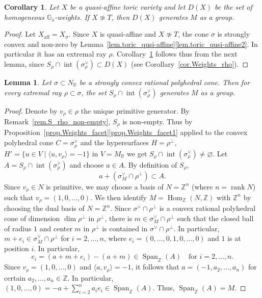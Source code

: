 \documentclass[11pt]{article}
\numberwithin{equation}{section}
\newcommand{\ra}{\mathrm{a}}
\let\oldvee\vee
\renewcommand{\vee}{{\scriptscriptstyle\oldvee}}
\let\oldbot\bot
\renewcommand{\bot}{{\scriptscriptstyle\oldbot}}
\theoremstyle{plain}
\newtheorem{lemma}[theorem]{Lemma}
\newtheorem{corollary}[theorem]{Corollary}
\theoremstyle{definition}
\DeclareMathOperator{\Hom}{Hom}
\DeclareMathOperator{\rank}{rank}
\DeclareMathOperator{\aff}{aff}
\DeclareMathOperator{\Span}{Span}
\DeclareMathOperator{\inter}{int}
\newcommand{\GG}{\mathbb{G}}
\newcommand{\RR}{\mathbb{R}}
\newcommand{\ZZ}{\mathbb{Z}}
\newcommand{\set}[2]{\{#1 \mid #2\}}
\newcommand{\sprod}[2]{\langle #1, #2 \rangle}
\begin{document}
\begin{corollary}
\label{cor.DX_generates_M_as_a_group}
Let $X$ be a quasi-affine toric variety and let $D(X)$ be the set of
homogeneous $\GG_\ra$-weights. If
$X \not \simeq T$, then $D(X)$ generates $M$ as a group.
\end{corollary}

\begin{proof}
Let $X_{\aff} = X_{\sigma}$.
Since $X$ is quasi-affine and $X \not\simeq T$, the cone $\sigma$ is strongly convex and
non-zero by Lemma~\ref{lem.toric_qusi-affine}\eqref{lem.toric_qusi-affine2}.
In particular it has an extremal ray $\rho$.
Corollary~\ref{cor.DX_generates_M_as_a_group} follows thus from the next lemma, since
$S_\rho \cap \inter(\sigma_{\rho}^\vee) \subset D(X)$ (see Corollary~\ref{cor.Weights_rho}).
\end{proof}

\begin{lemma}
Let $\sigma \subset N_{\RR}$ be a strongly convex rational polyhedral cone. Then for every
extremal ray $\rho \subset \sigma$, the set $S_{\rho} \cap \inter(\sigma_{\rho}^\vee)$ generates $M$ as a group.
\end{lemma}

\begin{proof}
Denote by $v_\rho \in \rho$ the unique primitive generator.
By Remark~\ref{rem.S_rho_non-empty}, $S_\rho$ is non-empty.
Thus by Proposition~\ref{prop.Weights_facet}\eqref{prop.Weights_facet1}
applied to the convex polyhedral cone $C = \sigma_{\rho}^\vee$
and the hypersurfaces $H = \rho^\bot$, $H' = \set{u \in V}{\sprod{u}{v_{\rho}}=-1}$ in $V = M_{\RR}$
we get $S_{\rho} \cap \inter(\sigma_{\rho}^\vee) \neq \varnothing$.
Let $A = S_{\rho} \cap \inter(\sigma_{\rho}^\vee)$ and choose $a \in A$.
By definition of $S_{\rho}$,
\[
a + (\sigma_M^\vee \cap \rho^\bot) \subset A.
\]
Since $v_{\rho} \in N$ is primitive,
we may choose a basis of $N = \ZZ^n$ (where $n = \rank N$) such
that $v_{\rho} = (1, 0, \ldots, 0)$. We then identify $M = \Hom_{\ZZ}(N, \ZZ)$
with $\ZZ^n$ by choosing the dual basis of $N = \ZZ^n$.
Since $\sigma^\vee \cap \rho^\bot$ is a convex rational polyhedral cone of dimension
$\dim \rho^\bot$ in $\rho^\bot$, there is $m \in \sigma_M^\vee \cap \rho^\bot$ such that
the closed ball of radius $1$ and center $m$ in $\rho^\bot$ is contained in
$\sigma^\vee \cap \rho^\bot$. In particular, $m + e_i \in \sigma_M^\vee \cap \rho^\bot$
for $i =2, \ldots, n$, where $e_i = (0, \ldots, 0, 1, 0, \ldots, 0)$ and $1$ is at position $i$.
In particular,
\[
e_i = (a + m + e_i) - (a+m) \in \Span_{\ZZ}(A) \quad \textrm{for $i=2, \ldots, n$}.
\]
Since $v_\rho = (1, 0, \ldots, 0)$ and $\sprod{a}{v_{\rho}} = -1$, it follows that
$a = (-1, a_2, \ldots, a_n)$ for certain $a_2, \ldots, a_n \in \ZZ$.
In particular, $(1, 0, \ldots, 0) = -a + \sum_{i=2}^n a_i e_i \in \Span_{\ZZ}(A)$.
Thus, $\Span_{\ZZ}(A) = M$.
\end{proof}
\end{document}
